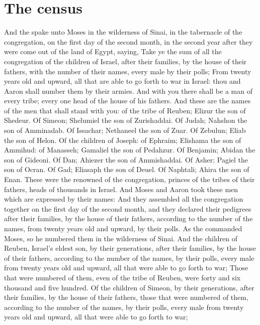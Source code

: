 
\section*{The census}
\begin{biblechapter} %
\verse And the \LORD spake unto Moses in the wilderness of Sinai, in the tabernacle of the congregation, on the first day of the second month, in the second year after they were come out of the land of Egypt, saying,
\verse Take ye the sum of all the congregation of the children of Israel, after their families, by the house of their fathers, with the number of their names, every male by their polls;
\verse From twenty years old and upward, all that are able to go forth to war in Israel: thou and Aaron shall number them by their armies.
\verse And with you there shall be a man of every tribe; every one head of the house of his fathers.
\verse And these are the names of the men that shall stand with you: of the tribe of Reuben; Elizur the son of Shedeur.
\verse Of Simeon; Shelumiel the son of Zurishaddai.
\verse Of Judah; Nahshon the son of Amminadab.
\verse Of Issachar; Nethaneel the son of Zuar.
\verse Of Zebulun; Eliab the son of Helon.
\verse Of the children of Joseph: of Ephraim; Elishama the son of Ammihud: of Manasseh; Gamaliel the son of Pedahzur.
\verse Of Benjamin; Abidan the son of Gideoni.
\verse Of Dan; Ahiezer the son of Ammishaddai.
\verse Of Asher; Pagiel the son of Ocran.
\verse Of Gad; Eliasaph the son of Deuel.
\verse Of Naphtali; Ahira the son of Enan.
\verse These were the renowned of the congregation, princes of the tribes of their fathers, heads of thousands in Israel.
\verse And Moses and Aaron took these men which are expressed by their names:
\verse And they assembled all the congregation together on the first day of the second month, and they declared their pedigrees after their families, by the house of their fathers, according to the number of the names, from twenty years old and upward, by their polls.
\verse As the \LORD commanded Moses, so he numbered them in the wilderness of Sinai.
\verse And the children of Reuben, Israel's eldest son, by their generations, after their families, by the house of their fathers, according to the number of the names, by their polls, every male from twenty years old and upward, all that were able to go forth to war;
\verse Those that were numbered of them, even of the tribe of Reuben, were forty and six thousand and five hundred.
\verse Of the children of Simeon, by their generations, after their families, by the house of their fathers, those that were numbered of them, according to the number of the names, by their polls, every male from twenty years old and upward, all that were able to go forth to war;

\end{biblechapter}
